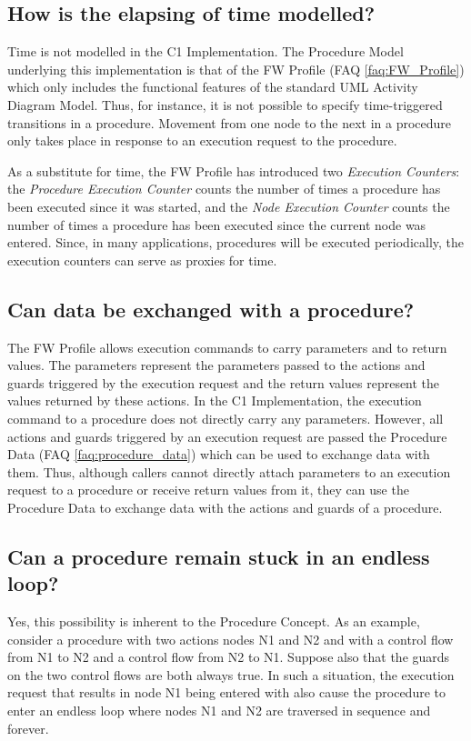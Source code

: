 \documentclass[a4paper,10pt]{article}
\begin{document}
\subsection{How is the elapsing of time modelled?}
Time is not modelled in the C1 Implementation. The Procedure Model underlying this implementation is that of the FW Profile (FAQ \ref{faq:FW_Profile}) which only 
includes the functional features of the standard UML Activity Diagram Model. Thus, for instance, it is not possible to specify time-triggered transitions 
in a procedure. Movement from one node to the next in a procedure only takes place in response to an execution request to the procedure. 

As a substitute for time, the FW Profile has introduced two \emph{Execution Counters}: the \emph{Procedure Execution Counter} counts the number of times 
a procedure has been executed since it was started, and the \emph{Node Execution Counter} counts the number of times a procedure has been executed since 
the current node was entered. Since, in many applications, procedures will be executed periodically, the execution counters can serve as proxies for time.  

\subsection{Can data be exchanged with a procedure?}
The FW Profile allows execution commands to carry parameters and to return values. The parameters represent the parameters passed to the actions and guards 
triggered by the execution request and the return values represent the values returned by these actions. In the C1 Implementation, the execution command 
to a procedure does not directly carry any parameters. However, all actions and guards triggered by an execution request are passed the Procedure Data 
(FAQ \ref{faq:procedure_data}) which can be used to exchange data with them. Thus, although callers cannot directly attach parameters 
to an execution request to a procedure or receive return values from it, they can use the Procedure Data to exchange data with the actions and guards of a procedure.

\subsection{Can a procedure remain stuck in an endless loop?}
Yes, this possibility is inherent to the Procedure Concept. As an example, consider a procedure with 
two actions nodes N1 and N2 and with a control flow from N1 to N2 and a control flow from N2 to N1. Suppose also that the guards on the two control flows 
are both always true. In such a situation, the execution request that results in node N1 being entered with also cause the procedure to enter an endless 
loop where nodes N1 and N2 are traversed in sequence and forever.
\end{document}
